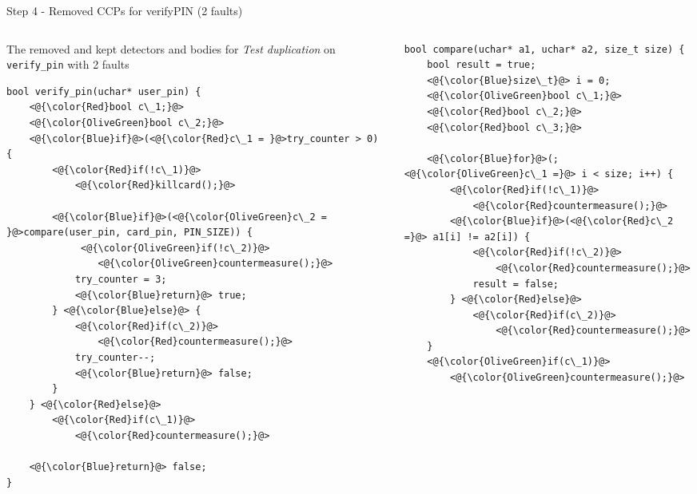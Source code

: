 \begin{frame}[fragile]{Step 4 - Removed CCPs for verifyPIN (2 faults)}
	\vfill
    \begin{columns}
        \begin{column}{0.50\textwidth}
            \vspace{0.2cm}
            
            The {\color{Red}removed} and {\color{OliveGreen}kept} detectors and bodies for \textit{Test duplication} on \texttt{verify\_pin} with 2 faults
            \vspace{0.5cm}
    
            \lstset{style=customc}
            \begin{lstlisting}
bool verify_pin(uchar* user_pin) {
    <@{\color{Red}bool c\_1;}@>
    <@{\color{OliveGreen}bool c\_2;}@>
    <@{\color{Blue}if}@>(<@{\color{Red}c\_1 = }@>try_counter > 0) {
        <@{\color{Red}if(!c\_1)}@>
            <@{\color{Red}killcard();}@>
            
        <@{\color{Blue}if}@>(<@{\color{OliveGreen}c\_2 = }@>compare(user_pin, card_pin, PIN_SIZE)) {
             <@{\color{OliveGreen}if(!c\_2)}@>
                <@{\color{OliveGreen}countermeasure();}@>
            try_counter = 3;
            <@{\color{Blue}return}@> true;
        } <@{\color{Blue}else}@> {
            <@{\color{Red}if(c\_2)}@>
                <@{\color{Red}countermeasure();}@>
            try_counter--;
            <@{\color{Blue}return}@> false;
        }
    } <@{\color{Red}else}@>
        <@{\color{Red}if(c\_1)}@>
            <@{\color{Red}countermeasure();}@>
    
    <@{\color{Blue}return}@> false;
}
            \end{lstlisting}
        \end{column}
        
        \begin{column}{0.5\textwidth}
            \lstset{style=customc}
            \begin{lstlisting}
bool compare(uchar* a1, uchar* a2, size_t size) {
    bool result = true;
    <@{\color{Blue}size\_t}@> i = 0;
    <@{\color{OliveGreen}bool c\_1;}@>
    <@{\color{Red}bool c\_2;}@>
    <@{\color{Red}bool c\_3;}@>
    
    <@{\color{Blue}for}@>(; <@{\color{OliveGreen}c\_1 =}@> i < size; i++) { 
        <@{\color{Red}if(!c\_1)}@>
            <@{\color{Red}countermeasure();}@>
        <@{\color{Blue}if}@>(<@{\color{Red}c\_2 =}@> a1[i] != a2[i]) {
            <@{\color{Red}if(!c\_2)}@>
                <@{\color{Red}countermeasure();}@>
            result = false; 
        } <@{\color{Red}else}@>
            <@{\color{Red}if(c\_2)}@>
                <@{\color{Red}countermeasure();}@> 
    }
    <@{\color{OliveGreen}if(c\_1)}@>
        <@{\color{OliveGreen}countermeasure();}@>


\end{lstlisting}
\end{column}
\end{columns}
\end{frame}
